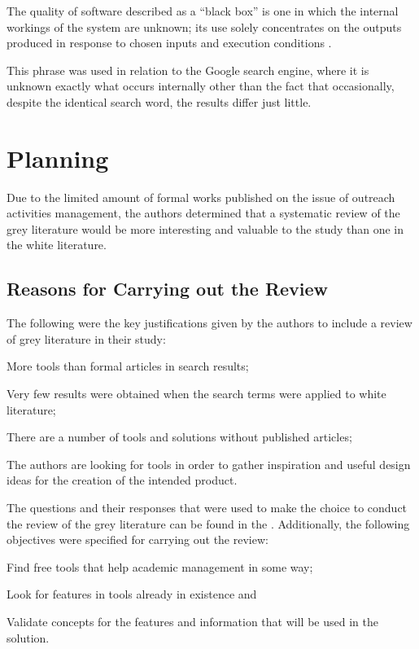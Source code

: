 The quality of software described as a ``black box'' is one in which the internal workings of the system are unknown; its use solely concentrates on the outputs produced in response to chosen inputs and execution conditions .

This phrase was used in relation to the Google search engine, where it is unknown exactly what occurs internally other than the fact that occasionally, despite the identical search word, the results differ just little.

\section{Planning}\label{sec:gl-planning}

Due to the limited amount of formal works published on the issue of outreach activities management, the authors determined that a systematic review of the grey literature would be more interesting and valuable to the study than one in the white literature.

\subsection{Reasons for Carrying out the Review}\label{sec:gl-planning-motives}

The following were the key justifications given by the authors to include a review of grey literature in their study:
\begin{inparaenum}[(i)]
    \item More tools than formal articles in search results;
    \item Very few results were obtained when the search terms were applied to white literature;
  \item There are a number of tools and solutions without published articles;
  \item The authors are looking for tools in order to gather inspiration and useful design ideas for the creation of the intended product.
\end{inparaenum}

The questions and their responses that were used to make the choice to conduct the review of the grey literature can be found in the . Additionally, the following objectives were specified for carrying out the review:

\begin{inparaenum}[(i)]
  \item Find free tools that help academic management in some way;
  \item Look for features in tools already in existence and
  \item Validate concepts for the features and information that will be used in the solution.
\end{inparaenum}


